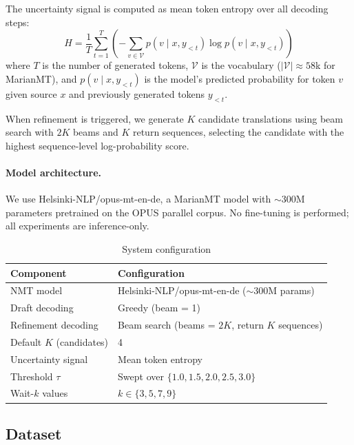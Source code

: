 The uncertainty signal is computed as mean token entropy over all decoding steps:
\begin{equation}
H = \frac{1}{T} \sum_{t=1}^{T} \left( -\sum_{v \in \mathcal{V}} p(v \mid x, y_{<t}) \log p(v \mid x, y_{<t}) \right)
\end{equation}
where $T$ is the number of generated tokens, $\mathcal{V}$ is the vocabulary ($|\mathcal{V}| \approx 58$k for MarianMT), and $p(v \mid x, y_{<t})$ is the model's predicted probability for token $v$ given source $x$ and previously generated tokens $y_{<t}$.

When refinement is triggered, we generate $K$ candidate translations using beam search with $2K$ beams and $K$ return sequences, selecting the candidate with the highest sequence-level log-probability score.

\paragraph{Model architecture.} We use Helsinki-NLP/opus-mt-en-de, a MarianMT model with $\sim$300M parameters pretrained on the OPUS parallel corpus. No fine-tuning is performed; all experiments are inference-only.

\begin{table}[h]
\caption{System configuration}
\label{tab:config}
\centering
\begin{tabular}{ll}
    \toprule
    Component & Configuration \\
    \midrule
    NMT model & Helsinki-NLP/opus-mt-en-de ($\sim$300M params) \\
    Draft decoding & Greedy (beam = 1) \\
    Refinement decoding & Beam search (beams = $2K$, return $K$ sequences) \\
    Default $K$ (candidates) & 4 \\
    Uncertainty signal & Mean token entropy \\
    Threshold $\tau$ & Swept over $\{1.0, 1.5, 2.0, 2.5, 3.0\}$ \\
    Wait-$k$ values & $k \in \{3, 5, 7, 9\}$ \\
    \bottomrule
\end{tabular}
\end{table}

\subsection{Dataset}

